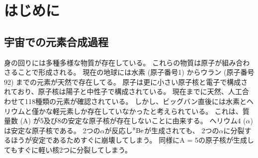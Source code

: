 \chapter{はじめに}
\section{宇宙での元素合成過程}
\label{seq::nucleaosynthesis}
身の回りには多種多様な物質が存在している。
これらの物質は原子が組み合わさることで形成される。
現在の地球には水素 (原子番号1) からウラン (原子番号92) までの元素が天然で存在してる。
原子は更に小さい原子核と電子で構成されており、原子核は陽子と中性子で構成されている。
現在までに天然、人工合わせて118種類の元素が確認されている。
しかし、ビッグバン直後には水素とヘリウムと僅かな軽元素しか存在していなかったと考えられている。
これは、質量数 (A) が5及び8の安定な原子核が存在しないことに由来する。
ヘリウム4 ($\alpha$) は安定な原子核である。
2つの$\alpha$が反応し${}^{8}{\rm Be}$が生成されても、
2つの$\alpha$に分裂するほうが安定であるためすぐに崩壊してしまう。
同様にA = 5の原子核が生成してもすぐに軽い核2つに分裂してしまう。

